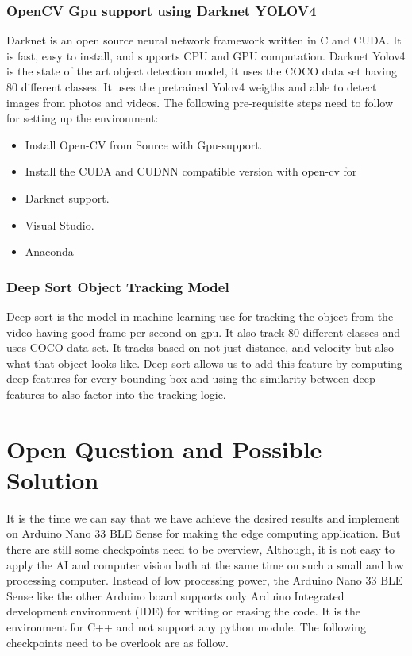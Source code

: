 \subsection{OpenCV Gpu support using Darknet YOLOV4}

Darknet is an open source neural network framework written in C and CUDA. It is fast, easy to install, and supports CPU and GPU computation. Darknet Yolov4 is the state of the art object detection model, it uses the COCO data set having 80 different classes. It uses the pretrained Yolov4 weigths and able to detect images from photos and videos. The following pre-requisite steps need to follow for setting up the environment:

\begin{itemize}
	\item Install Open-CV from Source with Gpu-support.
	\item Install the CUDA and CUDNN compatible version with open-cv for
	\item Darknet support.
	\item Visual Studio.
	\item Anaconda
\end{itemize}

\subsection{Deep Sort Object Tracking Model}

Deep sort is the model in machine learning use for tracking the object from the video having good frame per second on gpu. It also track 80 different classes and uses COCO data set. It tracks based on not just distance, and velocity but also what that object looks like. Deep sort allows us to add this feature by computing deep features for every bounding box and using the similarity between deep features to also factor into the tracking logic.











\chapter{Open Question and Possible Solution}
It is the time we can say that we have achieve the desired results and implement on Arduino Nano 33 BLE Sense for making the edge computing application. But there are still some checkpoints need to be overview, Although, it is not easy to apply the AI and computer vision both at the same time on such a small and low processing computer.  Instead of low processing power, the Arduino Nano 33 BLE Sense like the other Arduino board supports only Arduino Integrated development environment (IDE) for writing or erasing the code. It is the environment for C++ and not support any python module. The following checkpoints need to be overlook are as follow.


